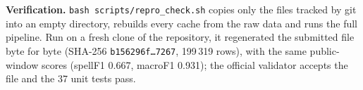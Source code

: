 \documentclass[10pt,a4paper]{article}
\newcommand{\code}[1]{\texttt{#1}}
\begin{document}
\textbf{Verification.} \code{bash scripts/repro\_check.sh} copies only the files tracked by git into
an empty directory, rebuilds every cache from the raw data and runs the full pipeline. Run on a fresh
clone of the repository, it regenerated the submitted file byte for byte (SHA-256 \code{b156296f\ldots7267},
199\,319 rows), with the same public-window scores (spellF1 0.667, macroF1 0.931); the official
validator accepts the file and the 37 unit tests pass.
\end{document}
